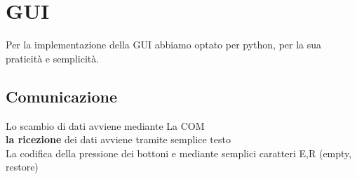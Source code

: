 \documentclass[a4paper,12pt]{report}
\begin{document}
\section{GUI}
Per la implementazione della GUI abbiamo optato per python,
per la sua praticità e semplicità.
\subsection{Comunicazione}
Lo scambio di dati avviene mediante La COM \\
\textbf{la ricezione} dei dati avviene tramite semplice testo  \\

\noindent
La codifica della pressione dei bottoni e mediante semplici caratteri
E,R (empty, restore)
\end{document}
